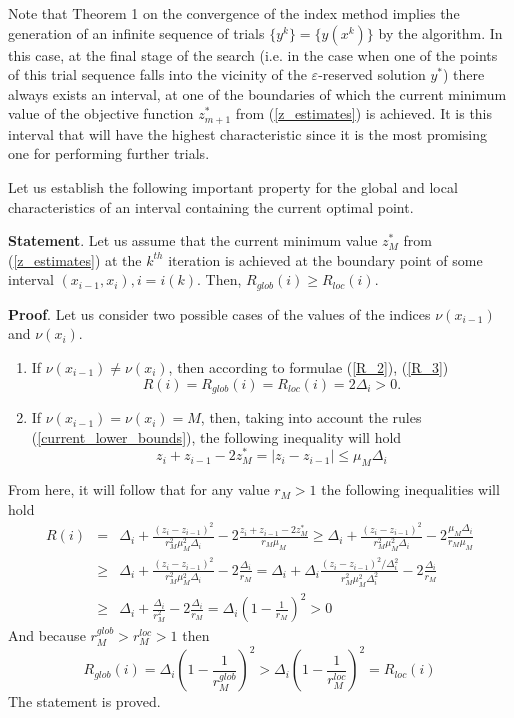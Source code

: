 \documentclass[review]{elsarticle}
\begin{document}
	Note that Theorem 1 on the convergence of the index method implies the generation of an infinite sequence of trials $\{y^k\}=\big\{y(x^k )\big\}$ by the algorithm. In this case, at the final stage of the search (i.e. in the case when one of the points of this trial sequence falls into the vicinity of the $\varepsilon$-reserved solution $y^\ast$) there always exists an interval, at one of the boundaries of which the current minimum value of the objective function $z_{m+1}^\ast$  from (\ref{z_estimates}) is achieved. It is this interval that will have the highest characteristic since it is the most promising one for performing further trials. 

	Let us establish the following important property for the global and local characteristics of an interval containing the current optimal point.

	\textbf{Statement}. Let us assume that the current minimum value $z_M^\ast$  from (\ref{z_estimates}) at the $k^{th}$ iteration is achieved at the boundary point of some interval $(x_{i-1}, x_i), i=i(k)$. Then, $R_{glob}(i) \geq R_{loc}(i)$.

	\textbf{Proof}. Let us consider two possible cases of the values of the indices $\nu(x_{i-1})$ and $\nu(x_i)$. 
\begin{enumerate} 
  \item If $\nu(x_{i-1}) \neq \nu(x_i)$, then according to  formulae (\ref{R_2}), (\ref{R_3}) 
\begin{equation}\label{R_glob_1}
	R(i)=R_{glob}(i)=R_{loc}(i)=2\Delta_i>0. 
\end{equation}
  \item If $\nu(x_{i-1}) = \nu(x_i) = M$, then, taking into account the rules (\ref{current_lower_bounds}), the following inequality will hold
$$
	z_i+z_{i-1}-2z_M^* = |z_i-z_{i-1}|\leq \mu_M\Delta_i
$$
\end{enumerate}
From here, it will follow that for any value $r_M>1$ the following inequalities will hold
\begin{eqnarray}
	R(i) & = & \Delta_i + \frac{(z_i-z_{i-1})^2}{r_M^2\mu_M^2\Delta_i} - 2\frac{z_i+z_{i-1}-2z_M^*}{r_M\mu_M} \geq \Delta_i + \frac{(z_i-z_{i-1})^2}{r_M^2\mu_M^2\Delta_i} - 2\frac{\mu_M\Delta_i}{r_M\mu_M} \nonumber \\
	& \geq & \Delta_i + \frac{(z_i-z_{i-1})^2}{r_M^2\mu_M^2\Delta_i} - 2\frac{\Delta_i}{r_M} = \Delta_i + \Delta_i\frac{(z_i-z_{i-1})^2/\Delta_i^2}{r_M^2\mu_M^2\Delta_i^2} - 2\frac{\Delta_i}{r_M}
\nonumber \\
	& \geq & \Delta_i + \frac{\Delta_i}{r_M^2} - 2\frac{\Delta_i}{r_M} = \Delta_i \left( 1-\frac{1}{r_M} \right)^2>0  
	\nonumber
\end{eqnarray}
And because $r_{M}^{glob} > r_{M}^{loc} > 1$ then
\begin{equation}\label{R_glob_greater_R_loc}
	R_{glob}(i)=\Delta_i\left(1-\frac{1}{r_M^{glob}} \right)^2 > \Delta_i\left(1-\frac{1}{r_M^{loc}} \right)^2 = R_{loc}(i)
\end{equation}
The statement is proved.
\end{document}
